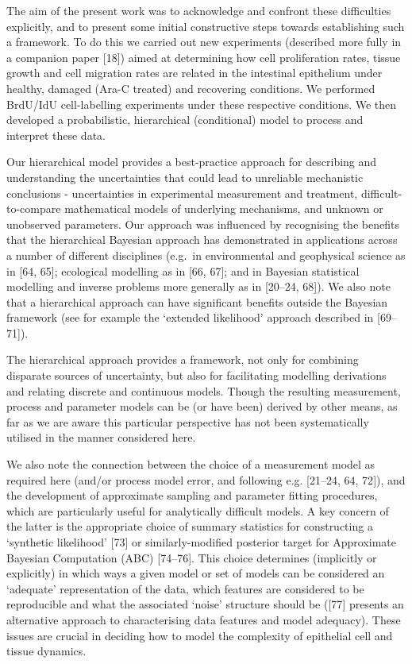 \documentclass[10pt,letterpaper]{article}
\begin{document}
The aim of the present work was to acknowledge and confront these
difficulties explicitly, and to present some initial constructive steps
towards establishing such a framework. To do this we carried out new
experiments (described more fully in a companion paper {[}18{]}) aimed
at determining how cell proliferation rates, tissue growth and cell
migration rates are related in the intestinal epithelium under healthy,
damaged (Ara-C treated) and recovering conditions. We performed BrdU/IdU
cell-labelling experiments under these respective conditions. We then
developed a probabilistic, hierarchical (conditional) model to process
and interpret these data.

Our hierarchical model provides a best-practice approach for describing
and understanding the uncertainties that could lead to unreliable
mechanistic conclusions - uncertainties in experimental measurement and
treatment, difficult-to-compare mathematical models of underlying
mechanisms, and unknown or unobserved parameters. Our approach was
influenced by recognising the benefits that the hierarchical Bayesian
approach has demonstrated in applications across a number of different
disciplines (e.g.~in environmental and geophysical science as in {[}64,
65{]}; ecological modelling as in {[}66, 67{]}; and in Bayesian
statistical modelling and inverse problems more generally as in
{[}20--24, 68{]}). We also note that a hierarchical approach can have
significant benefits outside the Bayesian framework (see for example the
`extended likelihood' approach described in {[}69--71{]}).

The hierarchical approach provides a framework, not only for combining
disparate sources of uncertainty, but also for facilitating modelling
derivations and relating discrete and continuous models. Though the
resulting measurement, process and parameter models can be (or have
been) derived by other means, as far as we are aware this particular
perspective has not been systematically utilised in the manner
considered here.

We also note the connection between the choice of a measurement model as
required here (and/or process model error, and following e.g. {[}21--24,
64, 72{]}), and the development of approximate sampling and parameter
fitting procedures, which are particularly useful for analytically
difficult models. A key concern of the latter is the appropriate choice
of summary statistics for constructing a `synthetic likelihood' {[}73{]}
or similarly-modified posterior target for Approximate Bayesian
Computation (ABC) {[}74--76{]}. This choice determines (implicitly or
explicitly) in which ways a given model or set of models can be
considered an `adequate' representation of the data, which features are
considered to be reproducible and what the associated `noise' structure
should be ({[}77{]} presents an alternative approach to characterising
data features and model adequacy). These issues are crucial in deciding
how to model the complexity of epithelial cell and tissue dynamics.
\end{document}
